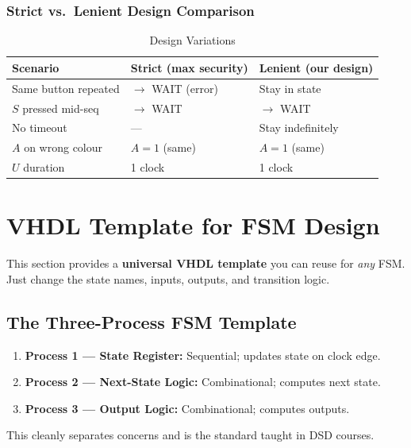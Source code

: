 \documentclass[12pt,a4paper]{article}
\begin{document}
\subsubsection{Strict vs.\ Lenient Design Comparison}

\begin{table}[H]
\centering
\caption{Design Variations}
\begin{tabular}{p{3cm}|p{4cm}|p{4cm}}
\toprule
\textbf{Scenario} & \textbf{Strict (max security)} & \textbf{Lenient (our design)} \\
\midrule
Same button repeated & $\to$ WAIT (error) & Stay in state \\
$S$ pressed mid-seq & $\to$ WAIT & $\to$ WAIT \\
No timeout & --- & Stay indefinitely \\
$A$ on wrong colour & $A=1$ (same) & $A=1$ (same) \\
$U$ duration & 1 clock & 1 clock \\
\bottomrule
\end{tabular}
\end{table}


\section{VHDL Template for FSM Design}
\label{sec:vhdl_template}

This section provides a \textbf{universal VHDL template} you can reuse for \emph{any} FSM.  Just change the state names, inputs, outputs, and transition logic.

\subsection{The Three-Process FSM Template}

\begin{infobox}
\begin{enumerate}
  \item \textbf{Process 1 --- State Register:} Sequential; updates state on clock edge.
  \item \textbf{Process 2 --- Next-State Logic:} Combinational; computes next state.
  \item \textbf{Process 3 --- Output Logic:} Combinational; computes outputs.
\end{enumerate}
This cleanly separates concerns and is the standard taught in DSD courses.
\end{infobox}
\end{document}
